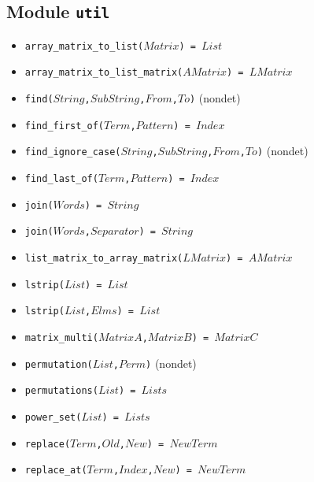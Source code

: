 \documentclass[10pt]{article}
\begin{document}
\begin{multicols}{2}
\section*{Module \texttt{util}}
\begin{scriptsize}
\begin{itemize}
    \item \texttt{array\_matrix\_to\_list($Matrix$) = $List$} 
    \item \texttt{array\_matrix\_to\_list\_matrix($AMatrix$) = $LMatrix$} 
    \item \texttt{find($String$,$SubString$,$From$,$To$)}  (nondet)
    \item \texttt{find\_first\_of($Term$,$Pattern$) = $Index$} 
    \item \texttt{find\_ignore\_case($String$,$SubString$,$From$,$To$)}  (nondet)
    \item \texttt{find\_last\_of($Term$,$Pattern$) = $Index$} 
    \item \texttt{join($Words$) = $String$} 
    \item \texttt{join($Words$,$Separator$) = $String$} 
    \item \texttt{list\_matrix\_to\_array\_matrix($LMatrix$) = $AMatrix$} 
    \item \texttt{lstrip($List$) = $List$ } 
    \item \texttt{lstrip($List$,$Elms$) = $List$ } 
    \item \texttt{matrix\_multi($MatrixA$,$MatrixB$) = $MatrixC$} 
    \item \texttt{permutation($List$,$Perm$)}  (nondet)
    \item \texttt{permutations($List$) = $Lists$} 
    \item \texttt{power\_set($List$) = $Lists$} 
    \item \texttt{replace($Term$,$Old$,$New$) = $NewTerm$} 
    \item \texttt{replace\_at($Term$,$Index$,$New$) = $NewTerm$} 

\end{itemize}
\end{scriptsize}
\end{multicols}
\end{document}
